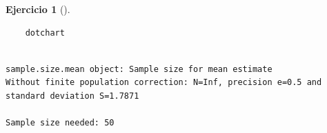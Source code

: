 \documentclass[
  a4paper,
]{scrreport}
\newenvironment{Shaded}{\begin{snugshade}}{\end{snugshade}}
\newcommand{\AttributeTok}[1]{\textcolor[rgb]{0.40,0.45,0.13}{#1}}
\newcommand{\FloatTok}[1]{\textcolor[rgb]{0.68,0.00,0.00}{#1}}
\newcommand{\FunctionTok}[1]{\textcolor[rgb]{0.28,0.35,0.67}{#1}}
\newcommand{\NormalTok}[1]{\textcolor[rgb]{0.00,0.23,0.31}{#1}}
\newcommand{\SpecialCharTok}[1]{\textcolor[rgb]{0.37,0.37,0.37}{#1}}
\theoremstyle{definition}
\newtheorem{exercise}{Ejercicio}[chapter]
\theoremstyle{remark}
\begin{document}
\begin{exercise}[]
\begin{enumerate}
\begin{tcolorbox}
\begin{verbatim}
    dotchart
\end{verbatim}

\begin{Shaded}
\end{Shaded}

\begin{verbatim}

sample.size.mean object: Sample size for mean estimate
Without finite population correction: N=Inf, precision e=0.5 and standard deviation S=1.7871

Sample size needed: 50
\end{verbatim}

  \end{tcolorbox}
\end{enumerate}

\end{exercise}
\end{document}
